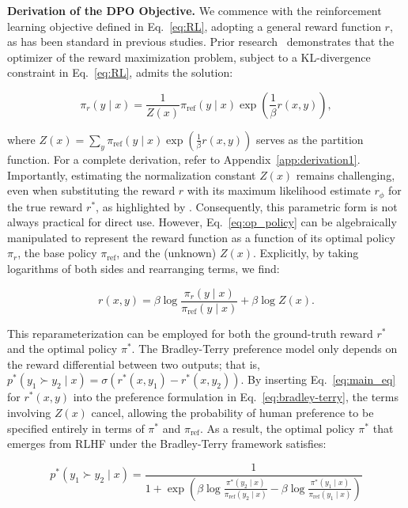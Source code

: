 \textbf{Derivation of the DPO Objective.} We commence with the reinforcement learning objective defined in Eq.~\ref{eq:RL}, adopting a general reward function $r$, as has been standard in previous studies. Prior research~\citep{peters2007reinforcement, peng2019advantage, korbak2022reinforcement, go2023aligning} demonstrates that the optimizer of the reward maximization problem, subject to a KL-divergence constraint in Eq.~\ref{eq:RL}, admits the solution:

\begin{equation}\label{eq:op_policy}
    \pi_r(y\mid x) = \frac{1}{Z(x)}\pi_\text{ref}(y\mid x)\exp\left(\frac{1}{\beta}r(x, y)\right),
\end{equation}

where $Z(x) =\sum_{y}\pi_\text{ref}(y\mid x)\exp\left(\frac{1}{\beta}r(x, y)\right)$ serves as the partition function. For a complete derivation, refer to Appendix~\ref{app:derivation1}. Importantly, estimating the normalization constant $Z(x)$ remains challenging, even when substituting the reward $r$ with its maximum likelihood estimate $r_\phi$ for the true reward $r^*$, as highlighted by \citet{korbak2022reinforcement, go2023aligning}. Consequently, this parametric form is not always practical for direct use. However, Eq.~\ref{eq:op_policy} can be algebraically manipulated to represent the reward function as a function of its optimal policy $\pi_r$, the base policy $\pi_\text{ref}$, and the (unknown) $Z(x)$. Explicitly, by taking logarithms of both sides and rearranging terms, we find:

\begin{equation}\label{eq:main_eq}
    r(x,y) =\beta \log \frac{\pi_r(y\mid x)}{\pi_\text{ref}(y\mid x)} + \beta \log Z(x).
\end{equation}

This reparameterization can be employed for both the ground-truth reward $r^*$ and the optimal policy $\pi^*$. The Bradley-Terry preference model only depends on the reward differential between two outputs; that is, ${p^*(y_1 \succ y_2 \mid x) = \sigma(r^*(x, y_1) - r^*(x, y_2))}$. By inserting Eq.~\ref{eq:main_eq} for $r^*(x,y)$ into the preference formulation in Eq.~\ref{eq:bradley-terry}, the terms involving $Z(x)$ cancel, allowing the probability of human preference to be specified entirely in terms of $\pi^*$ and $\pi_\text{ref}$. As a result, the optimal policy $\pi^*$ that emerges from RLHF under the Bradley-Terry framework satisfies:

\begin{equation}\label{eq:objective}
    p^*(y_1\succ y_2 \mid x)=\frac{1}{1 + \exp\left(\beta \log \frac{\pi^*(y_2\mid x)}{\pi_\text{ref}(y_2\mid x)} - \beta \log \frac{\pi^*(y_1\mid x)}{\pi_\text{ref}(y_1\mid x)}\right)}
\end{equation}

